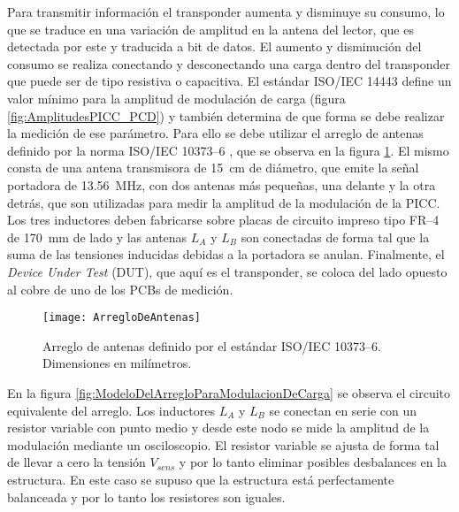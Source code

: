 Para transmitir información el transponder aumenta y disminuye su consumo, 
lo que se traduce en una variación de amplitud en la antena del lector, que 
es detectada por este y traducida a bit de datos. El aumento y disminución 
del consumo se realiza conectando y desconectando una carga dentro del 
transponder que puede ser de tipo resistiva o capacitiva. El estándar 
ISO/IEC 14443 define un valor mínimo para la amplitud de modulación de carga 
(figura \ref{fig:AmplitudesPICC_PCD}) y también determina de que forma se 
debe realizar la medición de ese parámetro. Para ello se debe utilizar el 
arreglo de antenas definido por la norma ISO/IEC 10373--6 \cite
{ISO10373Part6}, que se observa en la figura \ref{fig:ArregloDeAntenas}. El 
mismo consta de una antena transmisora de \SI{15}{\centi\meter} de diámetro, 
que emite la señal portadora de \SI{13.56}{\mega\hertz}, con dos antenas más 
pequeñas, una delante y la otra detrás, que son utilizadas para medir la 
amplitud de la modulación de la PICC. Los tres inductores deben fabricarse 
sobre placas de circuito impreso tipo FR--4 de \SI{170}{\milli\meter} de 
lado y las antenas \(L_A\) y \(L_B\) son conectadas de forma tal que la suma 
de las tensiones inducidas debidas a la portadora se anulan. Finalmente, el 
\emph{Device Under Test} (DUT), que aquí es el transponder, se coloca del 
lado opuesto al cobre de uno de los PCBs de medición.

\begin{figure}
	\centering
	\texttt{[image: ArregloDeAntenas]}
	\caption{Arreglo de antenas definido por el estándar ISO/IEC 10373--6. 
		Dimensiones en milímetros.}
	\label{fig:ArregloDeAntenas}
\end{figure}

En la figura \ref{fig:ModeloDelArregloParaModulacionDeCarga} se observa el 
circuito equivalente del arreglo. Los inductores \(L_A\) y \(L_B\) se 
conectan en serie con un resistor variable con punto medio y desde este nodo 
se mide la amplitud de la modulación mediante un osciloscopio. El 
resistor variable se ajusta de forma tal de llevar a 
cero la tensión \(V_{sens}\) y por lo tanto eliminar posibles desbalances en 
la estructura. En este caso se supuso que la estructura está
perfectamente balanceada y por lo tanto los resistores son iguales.

